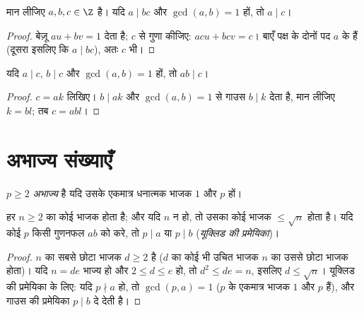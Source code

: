 \begin{theorem}[गाउस की प्रमेयिका]\label{thm:g12:arith:gauss}
मान लीजिए $a, b, c \in \Z$ है। यदि $a \mid bc$ और $\gcd(a, b) = 1$ हों, तो $a \mid c$।
\end{theorem}

\begin{proof}
बेज़ू $au + bv = 1$ देता है; $c$ से गुणा कीजिए: $acu + bcv = c$। बाएँ पक्ष के दोनों पद $a$
के  हैं (दूसरा इसलिए कि $a \mid bc$), अतः $c$ भी।
\end{proof}

\begin{corollary}\label{cor:g12:arith:coprimeprod}
यदि $a \mid c$, $b \mid c$ और $\gcd(a,b) = 1$ हों, तो $ab \mid c$।
\end{corollary}

\begin{proof}
$c = ak$ लिखिए। $b \mid ak$ और $\gcd(a,b)=1$ से गाउस $b \mid k$ देता है, मान लीजिए $k = bl$; तब $c = abl$।
\end{proof}

\section{अभाज्य संख्याएँ}

\begin{definition}[अभाज्य]\label{def:g12:arith:prime}
 $p \geq 2$ \emph{अभाज्य} है यदि उसके एकमात्र धनात्मक
भाजक $1$ और $p$ हों।
\end{definition}

\begin{proposition}\label{prop:g12:arith:primedivides}
हर  $n \geq 2$ का कोई  भाजक होता है; और यदि $n$  न हो, तो
उसका कोई  भाजक $\leq \sqrt n$ होता है। यदि कोई  $p$ किसी गुणनफल $ab$ को
 करे, तो $p \mid a$ या $p \mid b$ (\emph{यूक्लिड की प्रमेयिका})।
\end{proposition}

\begin{proof}
$n$ का सबसे छोटा भाजक $d \geq 2$  है ($d$ का कोई भी उचित भाजक $n$ का
उससे छोटा भाजक होता)। यदि $n = de$ भाज्य हो और $2 \leq d \leq e$ हो, तो $d^2 \leq de = n$, इसलिए $d \leq \sqrt n$।
यूक्लिड की प्रमेयिका के लिए: यदि $p \nmid a$ हो, तो $\gcd(p, a) = 1$ ($p$ के एकमात्र भाजक
$1$ और $p$ हैं), और गाउस की प्रमेयिका $p \mid b$ दे देती है।
\end{proof}

